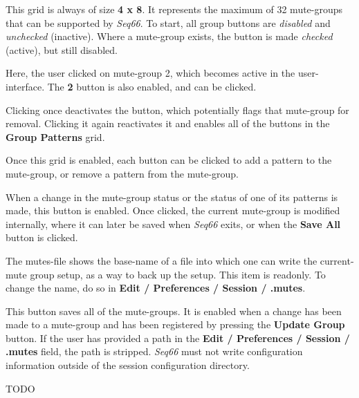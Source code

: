    This grid is always of size \textbf{4 x 8}.
   It represents the maximum of 32
   mute-groups that can be supported by \textsl{Seq66}.
   To start, all group buttons are \textsl{disabled} and
   \textsl{unchecked} (inactive).
   Where a mute-group exists, the button is made \textsl{checked} (active),
   but still disabled.

   Here, the user clicked on mute-group 2, which becomes active in the
   user-interface.
   The \textbf{2} button is also enabled, and can be clicked.

   Clicking once deactivates the button, which potentially flags that
   mute-group for removal.
   Clicking it again reactivates it and
   enables all of the
   buttons in the \textbf{Group Patterns} grid.

   Once this grid is enabled, each button can be clicked to add a pattern to
   the mute-group, or remove a pattern from the mute-group.

   When a change in the mute-group status or the status of one of its patterns
   is made, this button is enabled.
   Once clicked, the current mute-group is modified internally,
   where it can later be saved when \textsl{Seq66}
   exits, or when the \textbf{Save All} button is clicked.

   The mutes-file shows the base-name of a file into which one can write the
   current-mute group setup, as a way to back up the setup.
   This item is readonly. To change the name, do so in
   \textbf{Edit / Preferences / Session / .mutes}.

   This button saves all of the mute-groups.
   It is enabled when a change has been made to a mute-group and
   has been registered by pressing the \textbf{Update Group} button.
   If the user has provided a path in the
   \textbf{Edit / Preferences / Session / .mutes} field,
   the path is stripped.
   \textsl{Seq66} must not write configuration information outside of
   the session configuration directory.


   TODO

